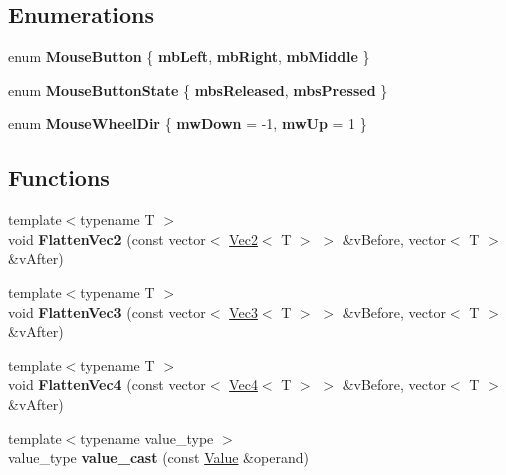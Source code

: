 \subsection*{Enumerations}
\begin{DoxyCompactItemize}
\item 
\hypertarget{namespaceps_a16308e3a3ee1e33d34721121c094cb43}{}enum {\bfseries Mouse\+Button} \{ {\bfseries mb\+Left}, 
{\bfseries mb\+Right}, 
{\bfseries mb\+Middle}
 \}\label{namespaceps_a16308e3a3ee1e33d34721121c094cb43}

\item 
\hypertarget{namespaceps_a6c9b19105dc5f516d5572176e51a9ae6}{}enum {\bfseries Mouse\+Button\+State} \{ {\bfseries mbs\+Released}, 
{\bfseries mbs\+Pressed}
 \}\label{namespaceps_a6c9b19105dc5f516d5572176e51a9ae6}

\item 
\hypertarget{namespaceps_a3bd32686503b7bdfd90c2fa332c1fdc9}{}enum {\bfseries Mouse\+Wheel\+Dir} \{ {\bfseries mw\+Down} = -\/1, 
{\bfseries mw\+Up} = 1
 \}\label{namespaceps_a3bd32686503b7bdfd90c2fa332c1fdc9}

\end{DoxyCompactItemize}
\subsection*{Functions}
\begin{DoxyCompactItemize}
\item 
\hypertarget{namespaceps_a5562c290f59fe785f9e9251a9fd289cc}{}{\footnotesize template$<$typename T $>$ }\\void {\bfseries Flatten\+Vec2} (const vector$<$ \hyperlink{classps_1_1base_1_1Vec2}{Vec2}$<$ T $>$ $>$ \&v\+Before, vector$<$ T $>$ \&v\+After)\label{namespaceps_a5562c290f59fe785f9e9251a9fd289cc}

\item 
\hypertarget{namespaceps_a60ffb74e823aa41b5a9608672d18b9be}{}{\footnotesize template$<$typename T $>$ }\\void {\bfseries Flatten\+Vec3} (const vector$<$ \hyperlink{classps_1_1base_1_1Vec3}{Vec3}$<$ T $>$ $>$ \&v\+Before, vector$<$ T $>$ \&v\+After)\label{namespaceps_a60ffb74e823aa41b5a9608672d18b9be}

\item 
\hypertarget{namespaceps_a0226df01b81c3aa0508d0f080fd6d6bc}{}{\footnotesize template$<$typename T $>$ }\\void {\bfseries Flatten\+Vec4} (const vector$<$ \hyperlink{classps_1_1base_1_1Vec4}{Vec4}$<$ T $>$ $>$ \&v\+Before, vector$<$ T $>$ \&v\+After)\label{namespaceps_a0226df01b81c3aa0508d0f080fd6d6bc}

\item 
\hypertarget{namespaceps_a69c7b65a2c75e0fc30b5a6ad7fa63de9}{}{\footnotesize template$<$typename value\+\_\+type $>$ }\\value\+\_\+type {\bfseries value\+\_\+cast} (const \hyperlink{classps_1_1Value}{Value} \&operand)\label{namespaceps_a69c7b65a2c75e0fc30b5a6ad7fa63de9}

\end{DoxyCompactItemize}



